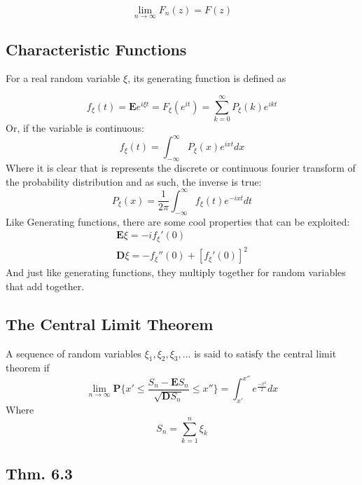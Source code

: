 \begin{equation}
	\lim_{n\rightarrow \infty} F_n(z) = F(z)
\end{equation}

\subsection{Characteristic Functions}

For a real random variable $\xi$, its generating function is defined as

\begin{equation}
	f_{\xi}(t) = \textbf{E}e^{i \xi t} = F_{\xi}(e^{i t}) = \sum_{k=0}^{\infty} P_{\xi}(k)e^{i k t}
\end{equation}
Or, if the variable is continuous:
\begin{equation}
	f_{\xi}(t) = \int_{-\infty}^{\infty} P_{\xi}(x)e^{i x t} dx
\end{equation}
Where it is clear that is represents the discrete or continuous fourier transform of the probability distribution and as such, the inverse is true:
\begin{equation}
	P_{\xi}(x) = \frac{1}{2 \pi}\int_{-\infty}^{\infty} f_{\xi}(t)e^{-i x t} dt
\end{equation}
Like Generating functions, there are some cool properties that can be exploited:
\begin{eqnarray}
	\textbf{E}\xi = -if_{\xi}'(0) \\
	\textbf{D}\xi = -f_{\xi}''(0) + [f_{\xi}'(0)]^2
\end{eqnarray}
And just like generating functions, they multiply together for random variables that add together.

\subsection{The Central Limit Theorem}

A sequence of random variables $\xi_1, \xi_2, \xi_3, ...$ is said to satisfy the central limit theorem if
\begin{equation}
	\lim_{n\rightarrow \infty} \textbf{P}\{ x' \leq \frac{S_n - \textbf{E}S_n}{\sqrt{\textbf{D}S_n}} \leq x''\} = \int_{x'}^{x''}e^{\frac{-x^2}{2}}dx
\end{equation}
Where
\begin{equation}
	S_n = \sum_{k=1}^n \xi_k
\end{equation}

\subsection{Thm. 6.3}

